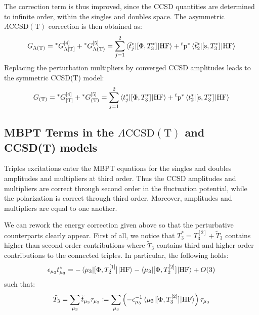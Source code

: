 The correction term is thus improved, since the \acrshort{CCSD} quantities
are determined to infinite order, within the singles and doubles space.
The asymmetric $\Lambda\text{CCSD}(\text{T})$ correction is then
obtained as:
\begin{equation}\label{eq:5-lambda-parens-t}
 \begin{aligned}
  G_{\Lambda(\text{T})} =
  {}^*G_{\Lambda[\text{T}]}^{[4]} +
  {}^*G_{\Lambda(\text{T})}^{[5]} =
  \sum_{j=1}^2
    \braket{\bar{t}_{j}^{*} | [ \Phi, T_3^{*} ]^{} | \mathrm{HF}}
  + {}^t\mathrm{p}^{*}\braket{\bar{t}_{2}^{*} | [ \mathrm{s}, T_3^{*} ]^{} | \mathrm{HF}}
 \end{aligned}
\end{equation}
Replacing the perturbation multipliers by converged \acrshort{CCSD}
amplitudes leads to the symmetric CCSD(T) model:
\begin{equation}\label{eq:5-parens-t}
 \begin{aligned}
  G_{(\text{T})} =
  {}^*G_{[\text{T}]}^{[4]} +
  {}^*G_{(\text{T})}^{[5]} =
  \sum_{j=1}^2
    \braket{t_{j}^{*} | [ \Phi, T_3^{*} ]^{} | \mathrm{HF}}
  + {}^t\mathrm{p}^{*}\braket{t_{2}^{*} | [ \mathrm{s}, T_3^{*} ]^{} | \mathrm{HF}}
 \end{aligned}
\end{equation}

\subsection{MBPT Terms in the
\texorpdfstring{$\Lambda\text{CCSD}(\text{T})$}{CCSD(aT)} and CCSD(T) models}

Triples excitations enter the \acrshort{MBPT} equations for the singles and
doubles amplitudes and multipliers at third order. Thus the \acrshort{CCSD}
amplitudes and multipliers are correct through second order in the
fluctuation potential, while the polarization is correct through third
order. Moreover, amplitudes and multipliers are equal to one another.

We can rework the energy correction given above so that the perturbative
counterparts clearly appear.
First of all, we notice that $T_3^{*} = T_3^{[2]} + \tilde{T}_3$ contains higher than second order
contributions where $\tilde{T}_3$ contains third and higher order contributions to the
connected triples. In particular, the following holds:
\begin{equation}
  \epsilon_{\mu_3}t_{\mu_3}^{*} =
  - \braket{\mu_3 |[ \Phi, T_2^{[1]} ]^{} | \mathrm{HF}}
  - \braket{\mu_3 | [ \Phi, T_2^{[2]} ]^{} | \mathrm{HF}}
  + O(3)
\end{equation}
such that:
\begin{equation}
  \tilde{T}_3
  = \sum_{\mu_3}\tilde{t}_{\mu_3}\tau_{\mu_3}
  \coloneq \sum_{\mu_3}
  \left(-\epsilon_{\mu_3}^{-1}\braket{\mu_3 |
  [ \Phi, T_3^{[2]} ]^{}
  | \mathrm{HF}}\right)
  \tau_{\mu_3}
\end{equation}

